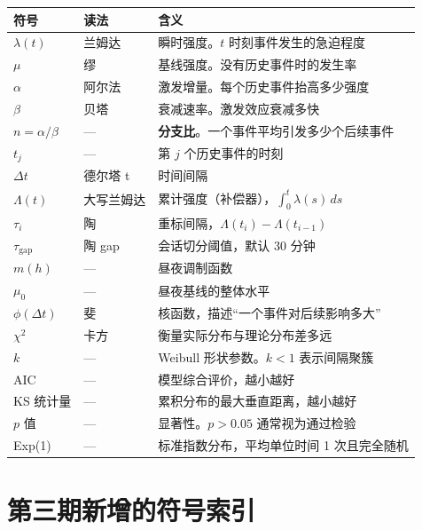 \documentclass[UTF8,a4paper,11pt]{ctexart}
\begin{document}
\begin{longtable}{@{}p{2.6cm}p{2.2cm}p{9.8cm}@{}}
\toprule
\textbf{符号} & \textbf{读法} & \textbf{含义} \\
\midrule
\endhead
$\lambda(t)$ & 兰姆达 & 瞬时强度。$t$ 时刻事件发生的急迫程度 \\
$\mu$ & 缪 & 基线强度。没有历史事件时的发生率 \\
$\alpha$ & 阿尔法 & 激发增量。每个历史事件抬高多少强度 \\
$\beta$ & 贝塔 & 衰减速率。激发效应衰减多快 \\
$n=\alpha/\beta$ & --- & \textbf{分支比}。一个事件平均引发多少个后续事件 \\
$t_j$ & --- & 第 $j$ 个历史事件的时刻 \\
$\Delta t$ & 德尔塔 t & 时间间隔 \\
$\Lambda(t)$ & 大写兰姆达 & 累计强度（补偿器），$\int_0^t\lambda(s)\,ds$ \\
$\tau_i$ & 陶 & 重标间隔，$\Lambda(t_i)-\Lambda(t_{i-1})$ \\
$\tau_{\text{gap}}$ & 陶 gap & 会话切分阈值，默认 30 分钟 \\
$m(h)$ & --- & 昼夜调制函数 \\
$\mu_0$ & --- & 昼夜基线的整体水平 \\
$\phi(\Delta t)$ & 斐 & 核函数，描述“一个事件对后续影响多大” \\
$\chi^2$ & 卡方 & 衡量实际分布与理论分布差多远 \\
$k$ & --- & Weibull 形状参数。$k<1$ 表示间隔聚簇 \\
AIC & --- & 模型综合评价，越小越好 \\
KS 统计量 & --- & 累积分布的最大垂直距离，越小越好 \\
$p$ 值 & --- & 显著性。$p>0.05$ 通常视为通过检验 \\
Exp(1) & --- & 标准指数分布，平均单位时间 1 次且完全随机 \\
\bottomrule
\end{longtable}

\newpage


\section{第三期新增的符号索引}
\end{document}
